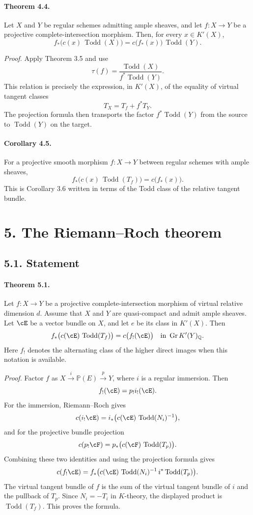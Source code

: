 \documentclass[11pt]{article}
\theoremstyle{plain}
\theoremstyle{definition}
\theoremstyle{remark}
\newcommand{\bP}{\mathbb P}
\newcommand{\QQ}{\mathbb Q}
\DeclareMathOperator{\Gr}{Gr}
\providecommand{\xto}[1]{\xrightarrow{#1}}
\providecommand{\Todd}{\operatorname{Todd}}
\begin{document}
\paragraph{Theorem 4.4.}
Let $X$ and $Y$ be regular schemes admitting ample sheaves, and let $f:X\to Y$ be a projective complete-intersection morphism. Then, for every $x\in K'(X)$,
\[
 f_*\bigl(c(x)\,\Todd(X)\bigr)=c\bigl(f_*(x)\bigr)\,\Todd(Y).
\]

\emph{Proof.}
Apply Theorem 3.5 and use
\[
 \tau(f)=\frac{\Todd(X)}{f^*\Todd(Y)}.
\]
This relation is precisely the expression, in $K'(X)$, of the equality of virtual tangent classes
\[
T_X=T_f+f^*T_Y.
\]
The projection formula then transports the factor $f^*\Todd(Y)$ from the source to $\Todd(Y)$ on the target.

\paragraph{Corollary 4.5.}
For a projective smooth morphism $f:X\to Y$ between regular schemes with ample sheaves,
\[
 f_*\bigl(c(x)\,\Todd(T_f)\bigr)=c\bigl(f_*(x)\bigr).
\]
This is Corollary 3.6 written in terms of the Todd class of the relative tangent bundle.

\section*{5. The Riemann--Roch theorem}

\subsection*{5.1. Statement}

\paragraph{Theorem 5.1.}
Let $f:X\to Y$ be a projective complete-intersection morphism of virtual relative dimension $d$. Assume that $X$ and $Y$ are quasi-compact and admit ample sheaves. Let $\cE$ be a vector bundle on $X$, and let $e$ be its class in $K'(X)$. Then
\[
 f_*\bigl(c(\cE)\,\Todd(T_f)\bigr)=c\bigl(f_!(\cE)\bigr)
 \quad\hbox{in }\Gr K'(Y)_\QQ .
\]
Here $f_!$ denotes the alternating class of the higher direct images when this notation is available.

\emph{Proof.}
Factor $f$ as $X\xto{i}\bP(E)\xto{p}Y$, where $i$ is a regular immersion. Then
\[
f_!(\cE)=p_!i_!(\cE).
\]
For the immersion, Riemann--Roch gives
\[
 c(i_!\cE)=i_*\bigl(c(\cE)\,\Todd(N_i)^{-1}\bigr),
\]
and for the projective bundle projection
\[
 c(p_!\cF)=p_*\bigl(c(\cF)\,\Todd(T_p)\bigr).
\]
Combining these two identities and using the projection formula gives
\[
 c(f_!\cE)=f_*\bigl(c(\cE)\,\Todd(N_i)^{-1}\,i^*\Todd(T_p)\bigr).
\]
The virtual tangent bundle of $f$ is the sum of the virtual tangent bundle of $i$ and the pullback of $T_p$. Since $N_i=-T_i$ in $K$-theory, the displayed product is $\Todd(T_f)$. This proves the formula.
\end{document}
